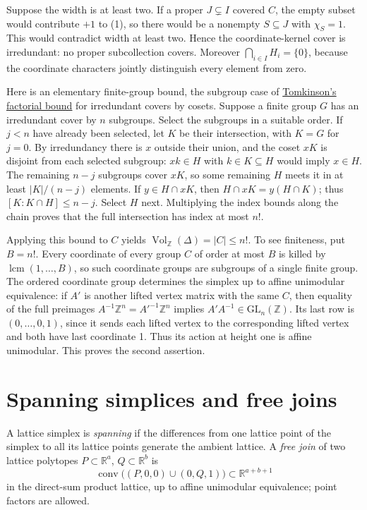 \documentclass[11pt]{article}
\begin{document}
Suppose the width is at least two. If a proper \(J\subsetneq I\) covered \(C\), the empty subset would contribute \(+1\) to (1), so there would be a nonempty \(S\subseteq J\) with \(\chi_S=1\). This would contradict width at least two. Hence the coordinate-kernel cover is irredundant: no proper subcollection covers. Moreover \(\bigcap_{i\in I}H_i=\{0\}\), because the coordinate characters jointly distinguish every element from zero.

Here is an elementary finite-group bound, the subgroup case of \href{https://doi.org/10.1080/00927878708823445}{Tomkinson's factorial bound} for irredundant covers by cosets. Suppose a finite group \(G\) has an irredundant cover by \(n\) subgroups. Select the subgroups in a suitable order. If \(j<n\) have already been selected, let \(K\) be their intersection, with \(K=G\) for \(j=0\). By irredundancy there is \(x\) outside their union, and the coset \(xK\) is disjoint from each selected subgroup: \(xk\in H\) with \(k\in K\subseteq H\) would imply \(x\in H\). The remaining \(n-j\) subgroups cover \(xK\), so some remaining \(H\) meets it in at least \(|K|/(n-j)\) elements. If \(y\in H\cap xK\), then \(H\cap xK=y(H\cap K)\); thus \([K:K\cap H]\le n-j\). Select \(H\) next. Multiplying the index bounds along the chain proves that the full intersection has index at most \(n!\).

Applying this bound to \(C\) yields \(\operatorname{Vol}_{\mathbb Z}(\Delta)=|C|\le n!\). To see finiteness, put \(B=n!\). Every coordinate of every group \(C\) of order at most \(B\) is killed by \(\operatorname{lcm}(1,\dots,B)\), so such coordinate groups are subgroups of a single finite group. The ordered coordinate group determines the simplex up to affine unimodular equivalence: if \(A'\) is another lifted vertex matrix with the same \(C\), then equality of the full preimages \(A^{-1}\mathbb Z^n=A'^{-1}\mathbb Z^n\) implies \(A'A^{-1}\in\mathrm{GL}_n(\mathbb Z)\). Its last row is \((0,\ldots,0,1)\), since it sends each lifted vertex to the corresponding lifted vertex and both have last coordinate 1. Thus its action at height one is affine unimodular. This proves the second assertion.

\section{Spanning simplices and free joins}\label{spanning-simplices-and-free-joins}

A lattice simplex is \emph{spanning} if the differences from one lattice point of the simplex to all its lattice points generate the ambient lattice. A \emph{free join} of two lattice polytopes \(P\subset\mathbb{R}^a\), \(Q\subset\mathbb{R}^b\) is
\[
\operatorname{conv}\big((P,0,0)\cup(0,Q,1)\big)\subset\mathbb{R}^{a+b+1}
\]
in the direct-sum product lattice, up to affine unimodular equivalence; point factors are allowed.
\end{document}
